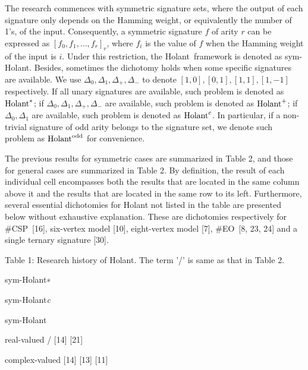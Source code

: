 \documentclass[10pt,a4paper]{article}
\begin{document}
The research commences with symmetric signature sets, where the output of each signature only depends on the Hamming weight, or equivalently the number of 1’s, of the input. Consequently, a symmetric signature $f$ of arity $r$ can be expressed as $[f_{0},f_{1},\ldots,f_{r}]_{r}$, where $f_{i}$ is the value of $f$ when the Hamming weight of the input is $i$. Under this restriction, the Holant framework is denoted as sym-Holant. Besides, sometimes the dichotomy holds when some specific signatures are available.
We use $\Delta_{0},\Delta_{1},\Delta_{+},\Delta_{-}$ to denote $[1,0],[0,1],[1,1],[1,-1]$ respectively. If all unary signatures are available, such problem is denoted as $\textup{{Holant}}^{*}$; if $\Delta_{0},\Delta_{1},\Delta_{+},\Delta_{-}$ are available, such problem is denoted as $\textup{{Holant}}^{+}$; if $\Delta_{0},\Delta_{1}$ are available, such problem is denoted as $\textup{{Holant}}^{c}$. In particular, if a non-trivial signature of odd arity belongs to the signature set, we denote such problem as $\textup{{Holant}}^{\text{odd}}$ for convenience.\par




The previous results for symmetric cases are summarized in Table 2, and those for general cases are summarized in Table 2.
By definition, the result of each individual cell encompasses both the results that are located in the same column above it and the results that are located in the same row to its left. Furthermore, several essential dichotomies for Holant not listed in the table are presented below without exhaustive explanation. These are dichotomies respectively for \#CSP [16], six-vertex model [10], eight-vertex model [7], \#EO [8, 23, 24] and a single ternary signature [30].\par




Table 1: Research history of Holant. The term ’/’ is same as that in Table 2.





 
sym-Holant∗
 
sym-Holant\emph{c}
 
sym-Holant
 
\par




real-valued 
/ 
[14] 
[21] 
\par


complex-valued 
[14] 
[13] 
[11] 
\par
\end{document}
